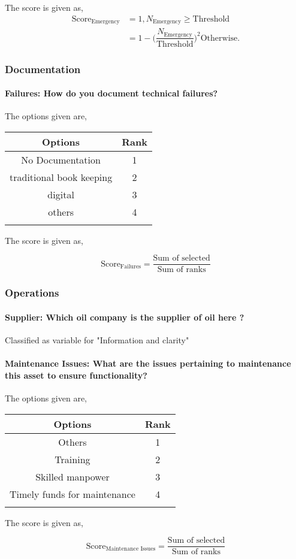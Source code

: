 \documentclass[oneside,twocolumn]{article}
\newcommand{\tsub}[2]{\text{#1}_{\text{#2}}}
\newcommand{\tsubb}[2]{#1_{\text{#2}}}
\newcommand{\dsub}[2]{\dfrac{\text{#1}}{\text{#2}}}
\newcommand{\multsel}[1]
{
	\[
		\tsub{Score}{#1} = \dsub{Sum of selected}{Sum of ranks}
	\]
}
\newenvironment{ttable}
{
\begin{center}
\begin{tabular}{c|c}
\hline
}
{
\\ \hline
\end{tabular}
\end{center}
}
\begin{document}
The score is given as,
\begin{align*}
\tsub{Score}{Emergency} &= 1, \tsubb{N}{Emergency} \ge \text{Threshold} \\
        &=
1 - \Big(\dfrac{\tsubb{N}{Emergency}}{\text{Threshold}}\Big)^{2}
\text{Otherwise}.
\end{align*}
\subsubsection{Documentation}

\paragraph{Failures: How do you document technical failures?}

The options given are,
\begin{ttable}
Options & Rank \\ \hline
No Documentation & 1 \\
traditional book keeping & 2 \\
digital & 3 \\
others & 4 \\
\hline
\end{ttable}
The score is given as,
\multsel{Failures}
\subsubsection{Operations}

\paragraph{Supplier: Which oil company is the supplier of oil here ?}

Classified as variable for "Information and         clarity"
\paragraph{Maintenance Issues: What are the issues pertaining to maintenance this asset to ensure functionality?}

The options given are,
\begin{ttable}
Options & Rank \\ \hline
Others & 1 \\
Training & 2 \\
Skilled manpower & 3 \\
Timely funds for maintenance & 4 \\
\hline
\end{ttable}
The score is given as,
\multsel{Maintenance Issues}
\end{document}
